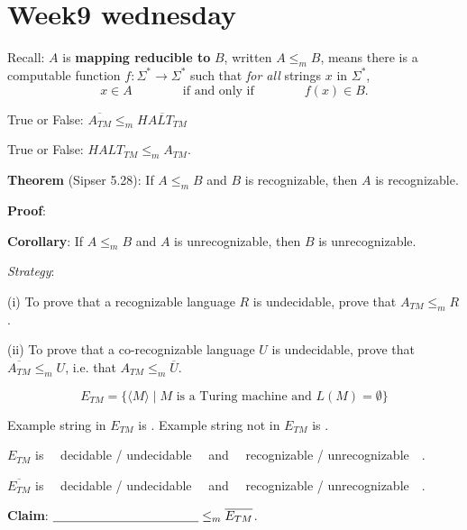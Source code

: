 \documentclass[12pt, oneside]{article}
\begin{document}
\begin{flushright}
\end{flushright} \section*{Week9 wednesday}


Recall:  $A$ is  {\bf  mapping  reducible to} $B$, written $A \leq_m B$,  means there is a computable function 
$f : \Sigma^* \to \Sigma^*$ such that {\it for all} strings  $x$ in $\Sigma^*$, 
\[
x  \in  A \qquad \qquad \text{if and  only  if} \qquad \qquad f(x) \in B.
\]

True or False: $\overline{A_{TM}} \leq_m \overline{HALT_{TM}}$

\vfill

True or False: $HALT_{TM} \leq_m A_{TM}$.

\vfill


{\bf Theorem} (Sipser 5.28): If $A \leq_m B$ and $B$ is recognizable, then $A$ is recognizable.

{\bf Proof}: 

\vfill

{\bf Corollary}: If  $A \leq_m B$ and $A$ is unrecognizable, then $B$ is unrecognizable.

\vfill

\newpage
{\it Strategy}:  

(i) To prove that a  recognizable language $R$ is undecidable, prove that $A_{TM} \leq_m R$.


(ii) To prove that a co-recognizable language $U$ is undecidable, prove that $\overline{A_{TM}} \leq_m U$,
 i.e. that $A_{TM} \leq_m \overline{U}$.

 

\[
E_{TM} = \{ \langle M \rangle \mid \text{$M$ is a Turing machine and $L(M) = \emptyset$} \}
\]

Example  string in  $E_{TM}$ is \underline{\phantom{\hspace{1.6in}}} .
Example  string not  in  $E_{TM}$ is \underline{\phantom{\hspace{1.6in}}} .

$E_{TM}$ is ~~decidable /  undecidable~~ and ~~recognizable /  unrecognizable~~.

$\overline{E_{TM}}$ is ~~decidable /  undecidable~~ and ~~recognizable /  unrecognizable~~.


{\bf Claim}: $\underline{\phantom{\hspace{1.6in}}}  \leq_m \overline{E_{TM}}$.
\end{document}
